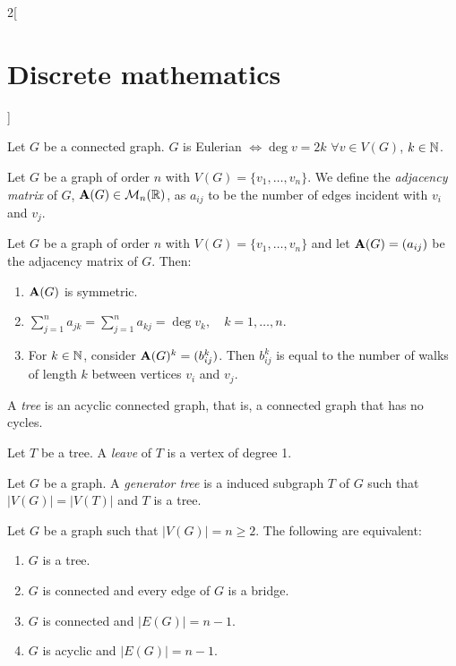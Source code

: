 \documentclass[../../../main.tex]{subfiles}
\begin{document}
\begin{multicols}{2}[\section{Discrete mathematics}]
\begin{definition}
  \end{definition}
  \begin{theorem}
    Let $G$ be a connected graph. $G$ is Eulerian $\iff\deg v=2k$ $\forall v\in V(G)$, $k\in\mathbb{N} $.
  \end{theorem}
  \begin{definition}
    Let $G$ be a graph of order $n$ with $V(G)=\{v_1,\ldots,v_n\}$. We define the \emph{adjacency matrix} of $G$, $\boldsymbol{\mathrm{A}}(G)\in\mathcal{M}_n(\mathbb{R} )$, as $a_{ij}$ to be the number of edges incident with $v_i$ and $v_j$.
  \end{definition}
  \begin{proposition}
    Let $G$ be a graph of order $n$ with $V(G)=\{v_1,\ldots,v_n\}$ and let $\boldsymbol{\mathrm{A}}(G)=(a_{ij})$ be the adjacency matrix of $G$. Then:
    \begin{enumerate}
      \item $\boldsymbol{\mathrm{A}}(G)$ is symmetric.
      \item $\displaystyle\sum_{j=1}^n a_{jk}=\sum_{j=1}^n a_{kj}=\deg v_k,\quad k=1,\ldots,n$.
      \item For $k\in\mathbb{N} $, consider $\boldsymbol{\mathrm{A}}(G)^k=(b_{ij}^k)$. Then $b_{ij}^k$ is equal to the number of walks of length $k$ between vertices $v_i$ and $v_j$.
    \end{enumerate}
  \end{proposition}
  \begin{definition}
    A \emph{tree} is an acyclic connected graph, that is, a connected graph that has no cycles.
  \end{definition}
  \begin{definition}
    Let $T$ be a tree. A \emph{leave} of $T$ is a vertex of degree 1.
  \end{definition}
  \begin{definition}
    Let $G$ be a graph. A \emph{generator tree} is a induced subgraph $T$ of $G$ such that $|V(G)|=|V(T)|$ and $T$ is a tree.
  \end{definition}
  \begin{proposition}
    Let $G$ be a graph such that $|V(G)|=n\geq 2$. The following are equivalent:
    \begin{enumerate}
      \item $G$ is a tree.
      \item $G$ is connected and every edge of $G$ is a bridge.
      \item $G$ is connected and $|E(G)|=n-1$.
      \item $G$ is acyclic and $|E(G)|=n-1$.

\end{enumerate}
\end{proposition}
\end{multicols}
\end{document}
